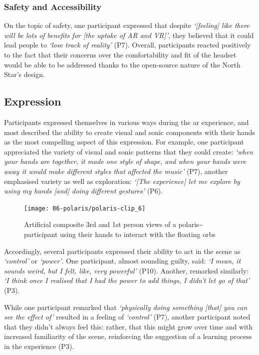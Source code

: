 \subsubsection{Safety and Accessibility}\label{sec: polaris-feedback-adoption-safety}
On the topic of safety, one participant expressed that despite \textit{`[feeling] like there will be lots of benefits for [the uptake of AR and VR]'}, they believed that it could lead people to \textit{`lose track of reality'} (P7). Overall, participants reacted positively to the fact that their concerns over the comfortability and fit of the headset would be able to be addressed thanks to the open-source nature of the North Star's design.

\subsection{Expression}\label{sec: polaris-feedback-expression}
Participants expressed themselves in various ways during the \gls{ar} experience, and most described the ability to create visual and sonic components with their hands as the most compelling aspect of this expression. For example, one participant appreciated the variety of visual and sonic patterns that they could create: \textit{`when your hands are together, it made one style of shape, and when your hands were away it would make different styles that affected the music'} (P7), another emphasised variety as well as exploration: \textit{`[The experience] let me explore by using my hands [and] doing different gestures'} (P6).

\begin{figure}[ht]
    \centering
    \texttt{[image: 06-polaris/polaris-clip\_6]}
    \captionsetup{justification=centering,margin=1.5cm}
    \caption{Artificial composite 3rd and 1st person views of a polaris\textasciitilde{} participant using their hands to interact with the floating orbs \citep[from][\href{https://youtu.be/T7CAjPk2Zs0}{at 0:00}]{bilbow2022}}\label{fig: polaris-clip_6}
\end{figure}

Accordingly, several participants expressed their ability to act in the scene as \textit{`control'} or \textit{`power'}. One participant, almost sounding guilty, said: \textit{`I mean, it sounds weird, but I felt, like, very powerful'} (P10). Another, remarked similarly: \textit{`I think once I realised that I had the power to add things, I didn't let go of that'} (P3).

While one participant remarked that \textit{`physically doing something [that] you can see the effect of'} resulted in a feeling of \textit{`control'} (P7), another participant noted that they didn't always feel this: rather, that this might grow over time and with increased familiarity of the scene, reinforcing the suggestion of a learning process in the experience (P3).

